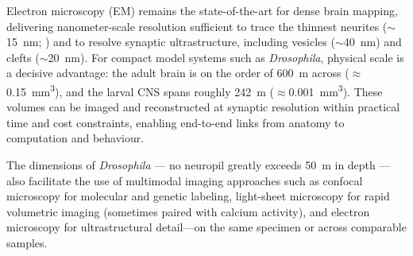 Electron microscopy (EM) remains the state-of-the-art for dense brain mapping, delivering nanometer-scale resolution sufficient to trace the thinnest neurites ($\sim$15~\si{\nano\metre}; \citep{meinertzhagen2016connectome}) and to resolve synaptic ultrastructure, including vesicles ($\sim$40~\si{\nano\metre}) and clefts ($\sim$20~\si{\nano\metre}). For compact model systems such as \textit{Drosophila}, physical scale is a decisive advantage: the adult brain is on the order of 600~\textmu m across ($\approx$0.15~\si{\milli\metre\cubed}), and the larval CNS spans roughly 242~\textmu m ($\approx$0.001~\si{\milli\metre\cubed}). These volumes can be imaged and reconstructed at synaptic resolution within practical time and cost constraints, enabling end-to-end links from anatomy to computation and behaviour.

The dimensions of \textit{Drosophila} — no neuropil greatly exceeds 50~\textmu m in depth \citep{meinertzhagen2016connectome} — also facilitate the use of multimodal imaging approaches such as confocal microscopy for molecular and genetic labeling, light-sheet microscopy for rapid volumetric imaging (sometimes paired with calcium activity), and electron microscopy for ultrastructural detail—on the same specimen or across comparable samples.

    \begin{table}[t]
    \centering
    \small
    \setlength{\tabcolsep}{4pt}
    \renewcommand{\arraystretch}{1.1}
    \caption[Mapped Connectomes]{\textbf{Mapped Connectomes} Comparison of major connectomes datasets across species, from \textit{C. elegans} to mouse visual cortex. All values are directly reported in the cited publications; no extrapolated voxel or volume data are included. Abbreviations: ssTEM, serial-section transmission EM; SBF/MB-EM, serial block-face or multi-beam EM.}
    \label{table-connectomes}
    \end{table}



